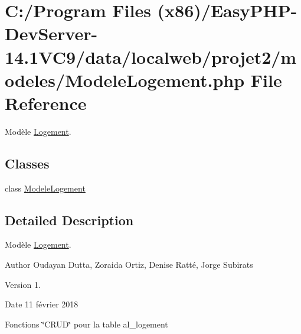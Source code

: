 \hypertarget{_modele_logement_8php}{}\section{C\+:/\+Program Files (x86)/\+Easy\+P\+H\+P-\/\+Dev\+Server-\/14.1\+V\+C9/data/localweb/projet2/modeles/\+Modele\+Logement.php File Reference}
\label{_modele_logement_8php}


Modèle \hyperlink{class_logement}{Logement}.  


\subsection*{Classes}
\begin{DoxyCompactItemize}
\item 
class \hyperlink{class_modele_logement}{Modele\+Logement}
\end{DoxyCompactItemize}


\subsection{Detailed Description}
Modèle \hyperlink{class_logement}{Logement}. 

\begin{DoxyAuthor}{Author}
Oudayan Dutta, Zoraida Ortiz, Denise Ratté, Jorge Subirats 
\end{DoxyAuthor}
\begin{DoxyVersion}{Version}
1. 
\end{DoxyVersion}
\begin{DoxyDate}{Date}
11 février 2018
\end{DoxyDate}
Fonctions \char`\"{}\+C\+R\+U\+D\char`\"{} pour la table al\+\_\+logement 